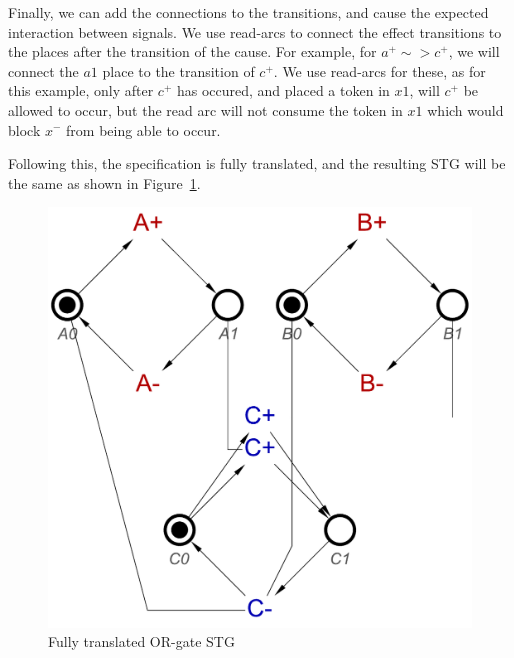 \documentclass[british,conference,compsoc]{IEEEtran}
\begin{document}
Finally, we can add the connections to the transitions, and cause the 
expected interaction between signals. We use read-arcs to connect the effect
transitions to the places after the transition of the cause. For example, for
$a^{+} \sim> c^{+}$, we will connect the $a1$ place to the 
transition of $c^{+}$. We use read-arcs for these, as for this example, only
after $c^{+}$ has occured, and placed a token in $x1$, will $c^{+}$ be allowed
to occur, but the read arc will not consume the token in $x1$ which would block
$x^{-}$ from being able to occur. 

Following this, the specification is fully translated, and the resulting STG 
will be the same as shown in Figure~\ref{fig:or-gate-stg}.

\begin{figure}[h]
\vspace{-4mm}
\begin{centering}
\includegraphics[scale=0.3]{Images/or-gate-stg}
\par\end{centering}
\protect\caption{\label{fig:or-gate-stg} Fully translated OR-gate STG}
\vspace{-5mm}
\end{figure}
\end{document}
